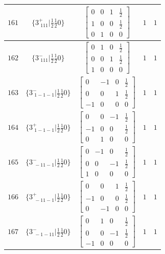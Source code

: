 \documentclass[fleqn,8pt]{jsarticle}
\begin{document}
\begin{longtable}{ccccc}
$ 161 $ & $ \{3^{+}_{\,\,111}|\frac{1}{2} \frac{1}{2} 0\} $ & $ \begin{bmatrix} 0 & 0 & 1 & \frac{1}{2} \\ 1 & 0 & 0 & \frac{1}{2} \\ 0 & 1 & 0 & 0 \end{bmatrix} $ & $ 1 $ & $ 1 $ \\ \hline
$ 162 $ & $ \{3^{-}_{\,\,111}|\frac{1}{2} \frac{1}{2} 0\} $ & $ \begin{bmatrix} 0 & 1 & 0 & \frac{1}{2} \\ 0 & 0 & 1 & \frac{1}{2} \\ 1 & 0 & 0 & 0 \end{bmatrix} $ & $ 1 $ & $ 1 $ \\ \hline
$ 163 $ & $ \{3^{-}_{\,\,1-1-1}|\frac{1}{2} \frac{1}{2} 0\} $ & $ \begin{bmatrix} 0 & -1 & 0 & \frac{1}{2} \\ 0 & 0 & 1 & \frac{1}{2} \\ -1 & 0 & 0 & 0 \end{bmatrix} $ & $ 1 $ & $ 1 $ \\ \hline
$ 164 $ & $ \{3^{+}_{\,\,1-1-1}|\frac{1}{2} \frac{1}{2} 0\} $ & $ \begin{bmatrix} 0 & 0 & -1 & \frac{1}{2} \\ -1 & 0 & 0 & \frac{1}{2} \\ 0 & 1 & 0 & 0 \end{bmatrix} $ & $ 1 $ & $ 1 $ \\ \hline
$ 165 $ & $ \{3^{-}_{\,\,-11-1}|\frac{1}{2} \frac{1}{2} 0\} $ & $ \begin{bmatrix} 0 & -1 & 0 & \frac{1}{2} \\ 0 & 0 & -1 & \frac{1}{2} \\ 1 & 0 & 0 & 0 \end{bmatrix} $ & $ 1 $ & $ 1 $ \\ \hline
$ 166 $ & $ \{3^{+}_{\,\,-11-1}|\frac{1}{2} \frac{1}{2} 0\} $ & $ \begin{bmatrix} 0 & 0 & 1 & \frac{1}{2} \\ -1 & 0 & 0 & \frac{1}{2} \\ 0 & -1 & 0 & 0 \end{bmatrix} $ & $ 1 $ & $ 1 $ \\ \hline
$ 167 $ & $ \{3^{-}_{\,\,-1-11}|\frac{1}{2} \frac{1}{2} 0\} $ & $ \begin{bmatrix} 0 & 1 & 0 & \frac{1}{2} \\ 0 & 0 & -1 & \frac{1}{2} \\ -1 & 0 & 0 & 0 \end{bmatrix} $ & $ 1 $ & $ 1 $ \\ \hline

\end{longtable}
\end{document}
